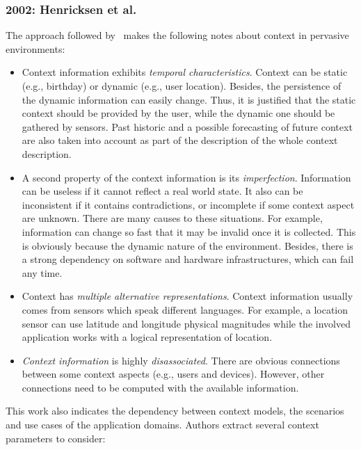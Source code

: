 \subsubsection{2002: Henricksen et al.}
\label{sec:henricksen}

The approach followed by~\citet{henricksen_modeling_2002} makes the following
notes about context in pervasive environments:

\begin{itemize}
  \item Context information exhibits \textit{temporal characteristics}. Context 
  can be  static (e.g., birthday) or dynamic (e.g., user location). Besides, the 
  persistence of the dynamic information can easily change. Thus, it is justified 
  that the static context should be provided by the user, while the dynamic 
  one should be gathered by sensors. Past historic and a possible forecasting 
  of future context are also taken into account as part of the description of 
  the whole context description.
  
  \item A second property of the context information is its \textit{imperfection}. 
  Information can be useless if it cannot reflect a real world state. It also 
  can be inconsistent if it contains contradictions, or incomplete if some 
  context aspect are unknown. There are many causes to these situations. For 
  example, information can change so fast that it may be invalid once it is 
  collected. This is obviously because the dynamic nature of the environment. 
  Besides, there is a strong dependency on software and hardware infrastructures, 
  which can fail any time.
  
  \item Context has \textit{multiple alternative representations}. Context 
  information usually comes from sensors which speak different languages. For 
  example, a location sensor can use latitude and longitude physical magnitudes 
  while the involved application works with a logical representation of location. 
  
  \item \textit{Context information} is highly \textit{disassociated}. There are 
  obvious connections between some context aspects (e.g., users and devices). 
  However, other connections need to be computed with the available information.
\end{itemize}

This work also indicates the dependency between context models, the scenarios 
and use cases of the application domains. Authors extract several context 
parameters to consider:

